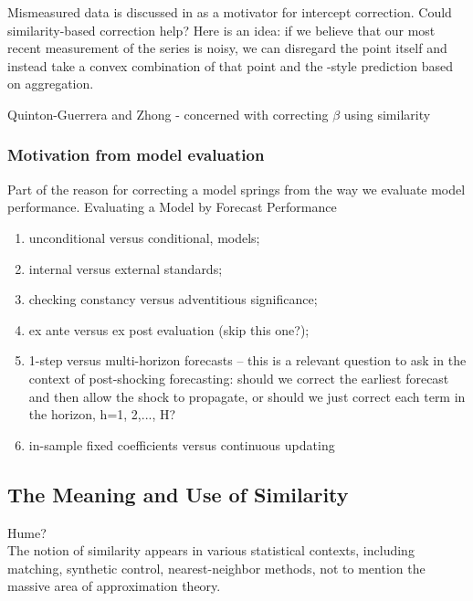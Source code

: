 \documentclass[11pt]{article}
\theoremstyle{definition}
\begin{document}
Mismeasured data is discussed in \cite[p. 166]{hendry1994theory} as a motivator for intercept correction.  Could similarity-based correction help?  Here is an idea: if we believe that our most recent measurement of the series is noisy, we can disregard the point itself and instead take a convex combination of that point and the \cite{lin2021minimizing}-style prediction based on aggregation.

Quinton-Guerrera and Zhong \cite{guerron2017macroeconomic} - concerned with correcting $\beta$ using similarity\\

\subsubsection{Motivation from model evaluation}

Part of the reason for correcting a model springs from the way we evaluate model performance.
Evaluating a Model by Forecast Performance \cite{clements2005evaluating}
\begin{enumerate}

  \item   unconditional versus conditional, models;
  \item internal versus external standards;
  \item checking constancy versus adventitious significance;
  \item ex ante versus ex post evaluation (skip this one?);
  \item 1-step versus multi-horizon forecasts -- this is a relevant question to ask in the context of post-shocking forecasting: should we correct the earliest forecast and then allow the shock to propagate, or should we just correct each term in the horizon, h=1, 2,..., H?
  \item in-sample fixed coefficients versus continuous updating
\end{enumerate}
 
\subsection{The Meaning and Use of Similarity}\label{meaning_use}
Hume?\\

The notion of similarity appears in various statistical contexts, including matching, synthetic control, nearest-neighbor methods, not to mention the massive area of approximation theory.\\
\end{document}

